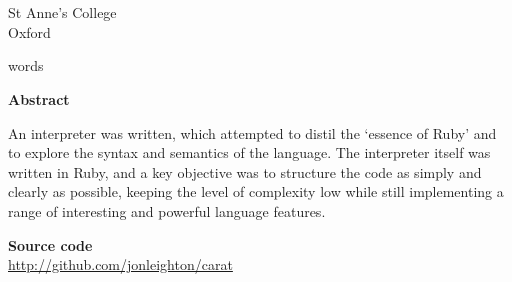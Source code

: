 
\begin{titlepage}
\begin{center}

  {\scshape {\huge \textbf{\gettitle}}} \\
  \bigskip
  {\Large
    \textbf{\getauthor} \\
    St Anne's College \\
    Oxford}\\
  \bigskip
  {\large \getdate}
  
	 words
	
	\vspace{1.5cm}
	
	{\Large \textbf{Abstract}}\\
  \parbox{10cm}{
  \bigskip
  An interpreter was written, which attempted to distil the `essence of Ruby' and
  to explore the syntax and semantics of the language. The interpreter itself was written in Ruby,
  and a key objective was to structure the code as simply and clearly as possible, keeping the
  level of complexity low while still implementing a range of interesting and powerful language
  features.
  }
	
	\vspace{1cm}
	
	\textbf{Source code} \\
	\url{http://github.com/jonleighton/carat}

\end{center}
\end{titlepage}

\restoregeometry
